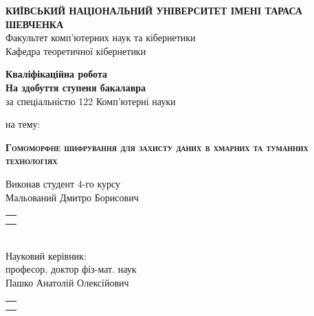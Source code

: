 \newcommand{\signature}{
{\footnotesize
\begin{tabular}{@{}p{1in}@{}}
    \hrulefill \\
    \vspace{-\baselineskip}
    \centering{(підпис)}
\end{tabular}}
}

\newpage
\begin{titlepage}
\begin{center}
\textbf{КИЇВСЬКИЙ НАЦІОНАЛЬНИЙ УНІВЕРСИТЕТ ІМЕНІ ТАРАСА ШЕВЧЕНКА}\\
Факультет комп’ютерних наук та кібернетики\\
Кафедра теоретичної кібернетики
\end{center}
\vspace{1em}
\begin{center}
\Large{\textbf{Кваліфікаційна робота}}\\
\normalsize{\textbf{На здобуття ступеня бакалавра}}\\
за спеціальністю 122 Комп’ютерні науки

\vspace{0.5em}
на тему:

\large{\textsc{\textbf{Гомоморфне шифрування для захисту даних в хмарних та туманних технологіях}}}
\end{center}
\vspace{1em}
\begin{flushleft}
Виконав студент 4-го курсу\\
Мальований Дмитро Борисович
\hspace{\fill}\signature\\
\vspace{0.5em}
Науковий керівник:\\
професор, доктор фіз-мат. наук\\
Пашко Анатолій Олексійович
\hspace{\fill}\signature\\
\end{flushleft}


\end{titlepage}
